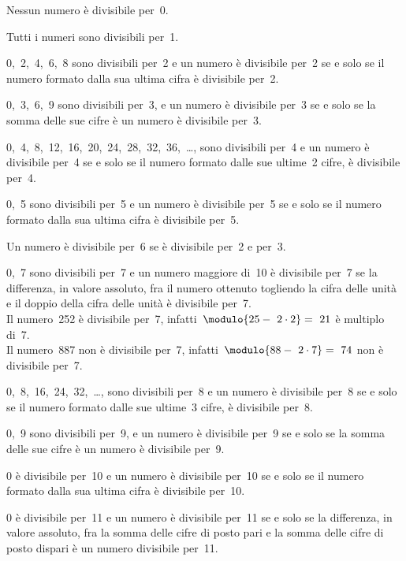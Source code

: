 \begin{description} [noitemsep]
\item[\textbf{0}:~] Nessun numero è divisibile per~0.
\item[\textbf{1}:~] Tutti i numeri sono divisibili per~1.
\item[\textbf{2}:~] 0,~2,~4,~6,~8 sono divisibili per~2 
e un numero è divisibile per~2 se e solo se il numero formato dalla sua 
ultima cifra è divisibile per~2.
\item[\textbf{3}:~] 0,~3,~6,~9 sono divisibili per~3,
e un numero è divisibile per~3 se e solo se la somma delle sue cifre è un 
numero è divisibile per~3.
\item[\textbf{4}:~] 0,~4,~8,~12,~16,~20,~24,~28,~32,~36,~\dots, 
sono divisibili per~4 
e un numero è divisibile per~4 se e solo se il numero formato dalle sue 
ultime~2 cifre, è divisibile per~4.
\item[\textbf{5}:~] 0,~5 sono divisibili per~5 
e un numero è divisibile per~5 se e solo se il numero formato dalla sua 
ultima cifra è divisibile per~5.
\item[\textbf{6}:~] Un numero è divisibile per~6 se è divisibile 
per~2 e per~3.
\item[\textbf{7}:~] 0,~7 sono divisibili per~7 
e un numero maggiore di~10 è divisibile per~7 se la differenza, 
in valore assoluto, fra il numero ottenuto togliendo la cifra delle unità 
e il doppio della cifra delle unità è divisibile per~7.\\
Il numero~252 è divisibile per~7, infatti~\( \modulo{25 -~2\cdot 2}=~21\) è 
multiplo di~7.\\
Il numero~887 non è divisibile per~7, infatti~\(\modulo{88 -~2\cdot 7}=~74\) 
non è divisibile per~7.
\item[\textbf{8}:~] 0,~8,~16,~24,~32,~\dots, sono 
divisibili per~8 
e un numero è divisibile per~8 se e solo se il numero formato dalle sue 
ultime~3 cifre, è divisibile per~8.
\item[\textbf{9}:~] 0,~9 sono divisibili per~9,
e un numero è divisibile per~9 se e solo se la somma delle sue cifre è un 
numero è divisibile per~9.
\item[\textbf{10}:~] 0 è divisibile per~10 
e un numero è divisibile per~10 se e solo se il numero formato dalla sua 
ultima cifra è divisibile per~10.
\item[\textbf{11}:~] 0 è divisibile per~11
e un numero è divisibile per~11 se e solo se la differenza, 
in valore assoluto, fra la somma delle cifre di posto pari e la somma delle 
cifre di posto dispari è un numero divisibile per~11.\\

\end{description}
